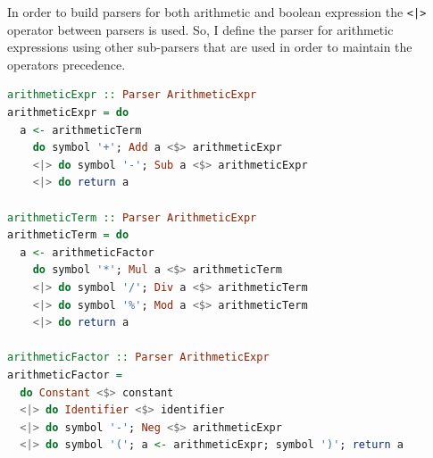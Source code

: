\documentclass[12pt,a4paper]{article}
\begin{document}
In order to build parsers for both arithmetic and boolean expression the \texttt{<|>} operator between parsers is used.
So, I define the parser for arithmetic expressions using other sub-parsers that are used in order to maintain the operators precedence.
\begin{lstlisting}[language=Haskell, style=custom-style]
arithmeticExpr :: Parser ArithmeticExpr
arithmeticExpr = do
  a <- arithmeticTerm
    do symbol '+'; Add a <$> arithmeticExpr
    <|> do symbol '-'; Sub a <$> arithmeticExpr
    <|> do return a

arithmeticTerm :: Parser ArithmeticExpr
arithmeticTerm = do
  a <- arithmeticFactor
    do symbol '*'; Mul a <$> arithmeticTerm
    <|> do symbol '/'; Div a <$> arithmeticTerm
    <|> do symbol '%'; Mod a <$> arithmeticTerm
    <|> do return a

arithmeticFactor :: Parser ArithmeticExpr
arithmeticFactor =
  do Constant <$> constant
  <|> do Identifier <$> identifier
  <|> do symbol '-'; Neg <$> arithmeticExpr
  <|> do symbol '('; a <- arithmeticExpr; symbol ')'; return a
\end{lstlisting}
\end{document}
